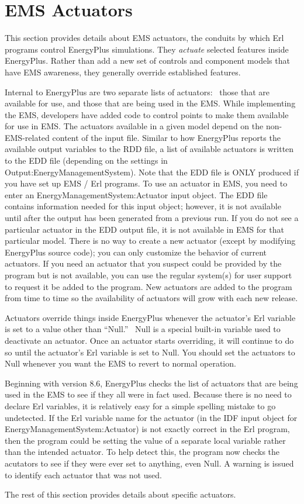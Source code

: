 \chapter{EMS Actuators}\label{ems-actuators}

This section provides details about EMS actuators, the conduits by which Erl programs control EnergyPlus simulations. They \emph{actuate} selected features inside EnergyPlus. Rather than add a new set of controls and component models that have EMS awareness, they generally override established features.

Internal to EnergyPlus are two separate lists of actuators:~ those that are available for use, and those that are being used in the EMS. While implementing the EMS, developers have added code to control points to make them available for use in EMS. The actuators available in a given model depend on the non-EMS-related content of the input file. Similar to how EnergyPlus reports the available output variables to the RDD file, a list of available actuators is written to the EDD file (depending on the settings in Output:EnergyManagementSystem). Note that the EDD file is ONLY produced if you have set up EMS / Erl programs. To use an actuator in EMS, you need to enter an EnergyManagementSystem:Actuator input object. The EDD file contains information needed for this input object; however, it is not available until after the output has been generated from a previous run. If you do not see a particular actuator in the EDD output file, it is not available in EMS for that particular model. There is no way to create a new actuator (except by modifying EnergyPlus source code); you can only customize the behavior of current actuators. If you need an actuator that you suspect could be provided by the program but is not available, you can use the regular system(s) for user support to request it be added to the program. New actuators are added to the program from time to time so the availability of actuators will grow with each new release.

Actuators override things inside EnergyPlus whenever the actuator's Erl variable is set to a value other than ``Null.''~ Null is a special built-in variable used to deactivate an actuator. Once an actuator starts overriding, it will continue to do so until the actuator's Erl variable is set to Null. You should set the actuators to Null whenever you want the EMS to revert to normal operation.

Beginning with version 8.6, EnergyPlus checks the list of actuators that are being used in the EMS to see if they all were in fact used.  Because there is no need to declare Erl variables, it is relatively easy for a simple spelling mistake to go undetected.  If the Erl variable name for the actuator (in the IDF input object for EnergyManagementSystem:Actuator) is not exactly correct in the Erl program, then the program could be setting the value of a separate local variable rather than the intended actuator.  To help detect this, the program now checks the acutators to see if they were ever set to anything, even Null.  A warning is issued to identify each actuator that was not used. 

The rest of this section provides details about specific actuators.
